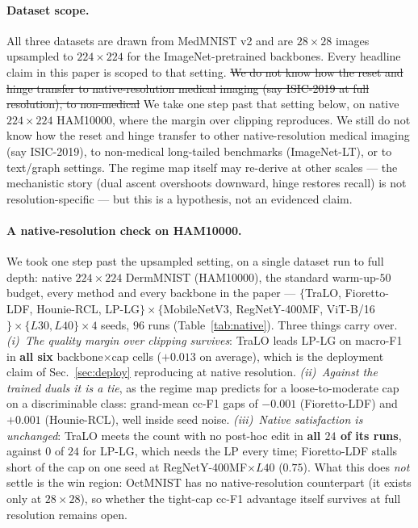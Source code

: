 \documentclass[10pt]{article}
\newcommand{\del}[1]{{\color{red}\sout{#1}}}
\begin{document}
\paragraph{Dataset scope.}
All three datasets are drawn from MedMNIST v2 and are $28{\times}28$
images upsampled to $224{\times}224$ for the ImageNet-pretrained
backbones. Every headline claim in this paper is scoped to that setting.
\del{We do not know how the reset and hinge transfer to native-resolution
medical imaging (say ISIC-2019 at full resolution), to non-medical}
{\color{blue}We take one step past that setting below, on native
$224{\times}224$ HAM10000, where the margin over clipping reproduces. We
still do not know how the reset and hinge transfer to other
native-resolution medical imaging (say ISIC-2019), to non-medical}
long-tailed benchmarks (ImageNet-LT), or to text/graph settings. The
regime map itself may re-derive at other scales --- the mechanistic story
(dual ascent overshoots downward, hinge restores recall) is not
resolution-specific --- but this is a hypothesis, not an evidenced claim.

{\color{blue}
\paragraph{A native-resolution check on HAM10000.}
We took one step past the upsampled setting, on a single dataset run to full depth:
native $224{\times}224$ DermMNIST (HAM10000), the standard warm-up-$50$ budget, every
method and every backbone in the paper --- $\{$TraLO, Fioretto-LDF, Hounie-RCL, LP-LG$\}
\times \{$MobileNetV3, RegNetY-400MF, ViT-B/16$\} \times \{L30, L40\} \times 4$ seeds,
$96$ runs (Table~\ref{tab:native}). Three things carry over. \emph{(i)~The quality margin
over clipping survives}: TraLO leads LP-LG on macro-F1 in \textbf{all six}
backbone$\times$cap cells ($+0.013$ on average), which is the deployment claim of
Sec.~\ref{sec:deploy} reproducing at native resolution. \emph{(ii)~Against the trained
duals it is a tie}, as the regime map predicts for a loose-to-moderate cap on a
discriminable class: grand-mean cc-F1 gaps of $-0.001$ (Fioretto-LDF) and $+0.001$
(Hounie-RCL), well inside seed noise. \emph{(iii)~Native satisfaction is unchanged}:
TraLO meets the count with no post-hoc edit in \textbf{all $24$ of its runs}, against
$0$ of $24$ for LP-LG, which needs the LP every time; Fioretto-LDF stalls short of the
cap on one seed at RegNetY-400MF$\times L40$ ($0.75$). What this does \emph{not} settle
is the win region: OctMNIST has no native-resolution counterpart (it exists only at
$28{\times}28$), so whether the tight-cap cc-F1 advantage itself survives at full
resolution remains open.}
\end{document}
